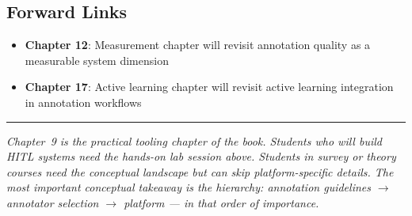 \subsection{Forward Links}
\begin{itemize}
    \item \textbf{Chapter 12}: Measurement chapter will revisit annotation quality as a measurable system dimension
    \item \textbf{Chapter 17}: Active learning chapter will revisit active learning integration in annotation workflows
\end{itemize}

\bigskip
\begin{center}
\rule{0.5\textwidth}{0.4pt}
\end{center}
\bigskip

\noindent\textit{Chapter~9 is the practical tooling chapter of the book. Students who will build HITL systems need the hands-on lab session above. Students in survey or theory courses need the conceptual landscape but can skip platform-specific details. The most important conceptual takeaway is the hierarchy: annotation guidelines $\rightarrow$ annotator selection $\rightarrow$ platform --- in that order of importance.}
